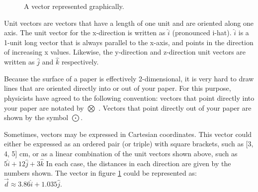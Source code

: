 \begin{figure}[h]
	\caption{A vector represented graphically.} \label{figure:M1}
	\centering
	
\end{figure}


	
	
	



	
	Unit vectors are vectors that have a length of one unit and are oriented along one axis.  The unit vector for the x-direction is written as $\hat{i}$ (pronounced i-hat).  $\hat{i}$ is a 1-unit long vector that is always parallel to the x-axis, and points in the direction of increasing x values.  Likewise, the y-direction and z-direction unit vectors are written as $\hat{j}$ and $\hat{k}$ respectively.  
	
	
	Because the surface of a paper is effectively 2-dimensional, it is very hard to draw lines that are oriented directly into or out of your paper. For this purpose, physicists have agreed to the following convention: vectors that point directly into your paper are notated by $\bigotimes$ .  Vectors that point directly out of your paper are shown by the symbol $\bigodot$.  
	
	Sometimes, vectors may be expressed in Cartesian coordinates.  This vector could either be expressed as an ordered pair (or triple) with square brackets, such as [3, 4, 5] cm, or as a linear combination of the unit vectors shown above, such as $5\hat{i} + 12 \hat{j} + 3 \hat{k}$  In each case, the distances in each direction are given by the numbers shown.  The vector in figure \ref{figure:M1} could be represented as: \color{blue} $\vec{d}  \approx 3.86 \hat{i} + 1.035 \hat{j}$.  \color{black}
	
